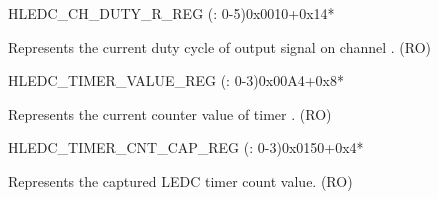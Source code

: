     \begin{register}{H}{LEDC\_CH\_DUTY\_R\_REG (: 0-5)}{0x0010+0x14*}\label{regdesc:LEDCCHNDUTYRREG}
    \regnewline%
    \begin{regdesc}\begin{reglist}
    \label{fielddesc:LEDCDUTYCHNR}\item [LEDC\_DUTY\_CH\regindex{n}\_R] Represents the current duty cycle of output signal on channel . (RO)
    \end{reglist}\end{regdesc}
    \end{register}


    \begin{register}{H}{LEDC\_TIMER\_VALUE\_REG (: 0-3)}{0x00A4+0x8*}\label{regdesc:LEDCTIMERNVALUEREG}
    \regnewline%
    \begin{regdesc}\begin{reglist}
    \label{fielddesc:LEDCTIMERNCNT}\item [LEDC\_TIMER\regindex{x}\_CNT] Represents the current counter value of timer . (RO)
    \end{reglist}\end{regdesc}
    \end{register}


    \begin{register}{H}{LEDC\_TIMER\_CNT\_CAP\_REG (: 0-3)}{0x0150+0x4*}\label{regdesc:LEDCTIMERNCNTCAPREG}
    \regnewline%
    \begin{regdesc}\begin{reglist}
    \label{fielddesc:LEDCTIMERNCNTCAP}\item [LEDC\_TIMER\regindex{x}\_CNT\_CAP] Represents the captured LEDC timer  count value. (RO)
    \end{reglist}\end{regdesc}
    \end{register}


